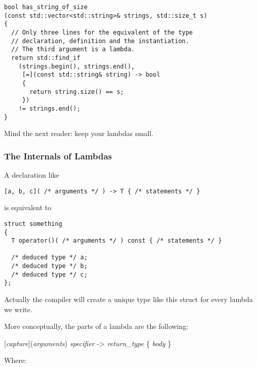 \begin{lstlisting}
bool has_string_of_size
(const std::vector<std::string>& strings, std::size_t s)
{
  // Only three lines for the equivalent of the type
  // declaration, definition and the instantiation.
  // The third argument is a lambda.
  return std::find_if
    (strings.begin(), strings.end(),
     [=](const std::string& string) -> bool
     {
       return string.size() == s;
     })
    != strings.end();
}
\end{lstlisting}

\begin{guideline}
  Mind the next reader: keep your lambdas small.
\end{guideline}

\subsubsection{The Internals of Lambdas}
\label{lambdas-internals}

A declaration like

\begin{lstlisting}
[a, b, c]( /* arguments */ ) -> T { /* statements */ }
\end{lstlisting}

is equivalent to

\begin{lstlisting}
struct something
{
  T operator()( /* arguments */ ) const { /* statements */ }

  /* deduced type */ a;
  /* deduced type */ b;
  /* deduced type */ c;
};
\end{lstlisting}

Actually the compiler will create a unique type like this struct for
every lambda we write.

More conceptually, the parts of a lambda are the following:

\bigskip

\begin{center}
[{\it capture}]({\it arguments}) {\it specifier} -\textgreater
        {\it return\_type} \{ {\it body} \}
\end{center}

\bigskip

Where:

